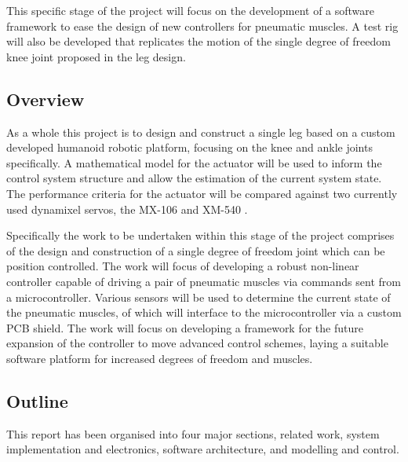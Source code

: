 \documentclass[11pt,a4paper]{article}
\begin{document}
This specific stage of the project will focus on the development of a software framework to ease the design of new controllers for pneumatic muscles. A test rig will also be developed that replicates the motion of the single degree of freedom knee joint proposed in the leg design.

\subsection{Overview}
\label{sub:overview}

As a whole this project is to design and construct a single leg based on a custom developed humanoid robotic platform, focusing on the knee and ankle joints specifically. A mathematical model for the actuator will be used to inform the control system structure and allow the estimation of the current system state. The performance criteria for the actuator will be compared against two currently used dynamixel servos, the MX-106 \cite{robotis_mx106} and XM-540 \cite{robotis}.

Specifically the work to be undertaken within this stage of the project comprises of the design and construction of a single degree of freedom joint which can be position controlled. The work will focus of developing a robust non-linear controller capable of driving a pair of pneumatic muscles via commands sent from a microcontroller. Various sensors will be used to determine the current state of the pneumatic muscles, of which will interface to the microcontroller via a custom PCB shield. The work will focus on developing a framework for the future expansion of the controller to move advanced control schemes, laying a suitable software platform for increased degrees of freedom and muscles.

\clearpage
\subsection{Outline}
\label{sub:outline}

This report has been organised into four major sections, related work, system implementation and electronics, software architecture, and modelling and control.
\end{document}
